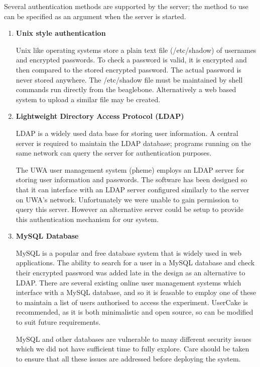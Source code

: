 Several authentication methods are supported by the server; the method to use can be specified as an argument when the server is started.
\begin{enumerate}
  \item {\bf Unix style authentication}


  Unix like operating systems store a plain text file (/etc/shadow) of usernames and encrypted passwords. To check a password is valid, it is encrypted and then compared to the stored encrypted password. The actual password is never stored anywhere. The /etc/shadow file must be maintained by shell commands run directly from the beaglebone. Alternatively a web based system to upload a similar file may be created.

  \item {\bf Lightweight Directory Access Protocol (LDAP)}

  LDAP is a widely used data base for storing user information. A central server is required to maintain the LDAP database; programs running on the same network can query the server for authentication purposes.

  The UWA user management system (pheme) employs an LDAP server for storing user information and passwords. The software has been designed so that it can interface with an LDAP server configured similarly to the server on UWA's network. Unfortunately we were unable to gain permission to query this server. However an alternative server could be setup to provide this authentication mechanism for our system.


  \item {\bf MySQL Database}

	MySQL is a popular and free database system that is widely used in web applications. The ability to search for a user in a MySQL database and check their encrypted password was added late in the design as an alternative to LDAP. There are several existing online user management systems which interface with a MySQL database, and so it is feasable to employ one of these to maintain a list of users authorised to access the experiment. UserCake is recommended, as it is both minimalistic and open source, so can be modified to suit future requirements.


  MySQL and other databases are vulnerable to many different security issues which we did not have sufficient time to fully explore. Care should be taken to ensure that all these issues are addressed before deploying the system.



\end{enumerate}

